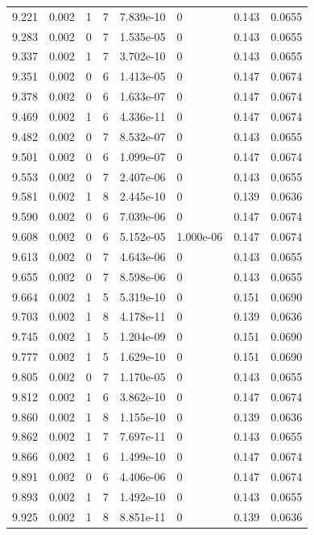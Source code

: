 \documentclass[preview]{standalone}
\begin{document}
{{{{{{{{{\begin{tabular}{L{1.2cm}C{1.2cm} C{0.3cm}C{0.5cm} C{1.4cm}C{1.4cm} C{1.4cm}C{1.4cm}}
  9.221  &  0.002  & 1     &  7 &  7.839e-10  & 0  & 0.143 &  0.0655   \\ 
  9.283  &  0.002  & 0     &  7 &  1.535e-05  & 0  & 0.143 &  0.0655   \\ 
  9.337  &  0.002  & 1     &  7 &  3.702e-10  & 0  & 0.143 &  0.0655   \\ 
  9.351  &  0.002  & 0     &  6 &  1.413e-05  & 0  & 0.147 &  0.0674   \\ 
  9.378  &  0.002  & 0     &  6 &  1.633e-07  & 0  & 0.147 &  0.0674   \\ 
  9.469  &  0.002  & 1     &  6 &  4.336e-11  & 0  & 0.147 &  0.0674   \\ 
  9.482  &  0.002  & 0     &  7 &  8.532e-07  & 0  & 0.143 &  0.0655   \\ 
  9.501  &  0.002  & 0     &  6 &  1.099e-07  & 0  & 0.147 &  0.0674   \\ 
  9.553  &  0.002  & 0     &  7 &  2.407e-06  & 0  & 0.143 &  0.0655   \\ 
  9.581  &  0.002  & 1     &  8 &  2.445e-10  & 0  & 0.139 &  0.0636   \\ 
  9.590  &  0.002  & 0     &  6 &  7.039e-06  & 0  & 0.147 &  0.0674   \\ 
  9.608  &  0.002  & 0     &  6 &  5.152e-05  & 1.000e-06  & 0.147 &  0.0674   \\ 
  9.613  &  0.002  & 0     &  7 &  4.643e-06  & 0  & 0.143 &  0.0655   \\ 
  9.655  &  0.002  & 0     &  7 &  8.598e-06  & 0  & 0.143 &  0.0655   \\ 
  9.664  &  0.002  & 1     &  5 &  5.319e-10  & 0  & 0.151 &  0.0690   \\ 
  9.703  &  0.002  & 1     &  8 &  4.178e-11  & 0  & 0.139 &  0.0636   \\ 
  9.745  &  0.002  & 1     &  5 &  1.204e-09  & 0  & 0.151 &  0.0690   \\ 
  9.777  &  0.002  & 1     &  5 &  1.629e-10  & 0  & 0.151 &  0.0690   \\ 
  9.805  &  0.002  & 0     &  7 &  1.170e-05  & 0  & 0.143 &  0.0655   \\ 
  9.812  &  0.002  & 1     &  6 &  3.862e-10  & 0  & 0.147 &  0.0674   \\ 
  9.860  &  0.002  & 1     &  8 &  1.155e-10  & 0  & 0.139 &  0.0636   \\ 
  9.862  &  0.002  & 1     &  7 &  7.697e-11  & 0  & 0.143 &  0.0655   \\ 
  9.866  &  0.002  & 1     &  6 &  1.499e-10  & 0  & 0.147 &  0.0674   \\ 
  9.891  &  0.002  & 0     &  6 &  4.406e-06  & 0  & 0.147 &  0.0674   \\ 
  9.893  &  0.002  & 1     &  7 &  1.492e-10  & 0  & 0.143 &  0.0655   \\ 
  9.925  &  0.002  & 1     &  8 &  8.851e-11  & 0  & 0.139 &  0.0636   \\ 
\hline 
\end{tabular} 

}}}}}}}}}
\end{document}
